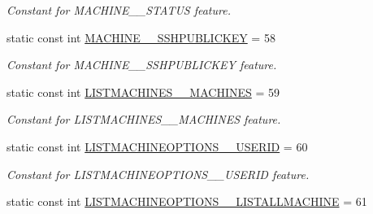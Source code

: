\begin{DoxyCompactItemize}
\begin{DoxyCompactList}\small\item\em Constant for MACHINE\_\-\_\-STATUS feature. \item\end{DoxyCompactList}\item 
\hypertarget{classUMS__Data_1_1UMS__DataPackage_a9ca542752dba016af3c3ea52de6b37a8}{
static const int \hyperlink{classUMS__Data_1_1UMS__DataPackage_a9ca542752dba016af3c3ea52de6b37a8}{MACHINE\_\-\_\-SSHPUBLICKEY} = 58}
\label{classUMS__Data_1_1UMS__DataPackage_a9ca542752dba016af3c3ea52de6b37a8}

\begin{DoxyCompactList}\small\item\em Constant for MACHINE\_\-\_\-SSHPUBLICKEY feature. \item\end{DoxyCompactList}\item 
\hypertarget{classUMS__Data_1_1UMS__DataPackage_a9ba17a0d9529d69750fbc65d937c72e2}{
static const int \hyperlink{classUMS__Data_1_1UMS__DataPackage_a9ba17a0d9529d69750fbc65d937c72e2}{LISTMACHINES\_\-\_\-MACHINES} = 59}
\label{classUMS__Data_1_1UMS__DataPackage_a9ba17a0d9529d69750fbc65d937c72e2}

\begin{DoxyCompactList}\small\item\em Constant for LISTMACHINES\_\-\_\-MACHINES feature. \item\end{DoxyCompactList}\item 
\hypertarget{classUMS__Data_1_1UMS__DataPackage_a11466af738c5dec6d37c23b91beeb20c}{
static const int \hyperlink{classUMS__Data_1_1UMS__DataPackage_a11466af738c5dec6d37c23b91beeb20c}{LISTMACHINEOPTIONS\_\-\_\-USERID} = 60}
\label{classUMS__Data_1_1UMS__DataPackage_a11466af738c5dec6d37c23b91beeb20c}

\begin{DoxyCompactList}\small\item\em Constant for LISTMACHINEOPTIONS\_\-\_\-USERID feature. \item\end{DoxyCompactList}\item 
\hypertarget{classUMS__Data_1_1UMS__DataPackage_a312bfc42f1a3231e36fd76e051851e57}{
static const int \hyperlink{classUMS__Data_1_1UMS__DataPackage_a312bfc42f1a3231e36fd76e051851e57}{LISTMACHINEOPTIONS\_\-\_\-LISTALLMACHINE} = 61}
\label{classUMS__Data_1_1UMS__DataPackage_a312bfc42f1a3231e36fd76e051851e57}


\end{DoxyCompactItemize}
